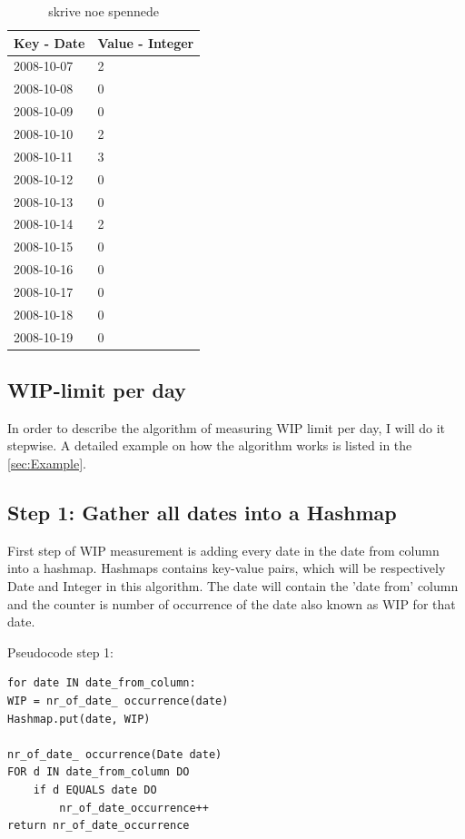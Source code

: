 \documentclass[UKenglish]{ifimaster}  %
\begin{document}
\begin{table}[ht]
\begin{center}
    \begin{tabular}{| l | p{5cm} |}
    \hline
     Key - Date  & Value - Integer\\ \hline
     2008-10-07 & 2   \\ \hline
     2008-10-08 & 0   \\ \hline
     2008-10-09 & 0   \\ \hline
     2008-10-10 & 2   \\ \hline
     2008-10-11 & 3   \\ \hline
     2008-10-12 & 0   \\ \hline
     2008-10-13 & 0   \\ \hline
     2008-10-14 & 2   \\ \hline
     2008-10-15 & 0   \\ \hline
     2008-10-16 & 0   \\ \hline
     2008-10-17 & 0   \\ \hline
     2008-10-18 & 0   \\ \hline
     2008-10-19 & 0   \\ \hline
    \end{tabular}
\caption{skrive noe spennede}
\label{IC} %
\end{center}
\end{table}

\subsection {WIP-limit per day}
In order to describe the algorithm of measuring WIP limit per day, I will do it stepwise.  A detailed example on how the algorithm works is listed in the \ref{sec:Example}.

\subsection{Step 1: Gather all dates into a Hashmap}
\label{sub:stepOne}
First step of WIP measurement is adding every date in the date from column into a hashmap. Hashmaps contains key-value pairs, which will be respectively Date and Integer in this algorithm.  The date will contain the 'date from' column and the counter is number of occurrence of the date also known as WIP for that date. 

Pseudocode step 1:
 \begin{lstlisting}
for date IN date_from_column:
WIP = nr_of_date_ occurrence(date)
Hashmap.put(date, WIP)

nr_of_date_ occurrence(Date date) 
FOR d IN date_from_column DO
	if d EQUALS date DO
		nr_of_date_occurrence++
return nr_of_date_occurrence
 \end{lstlisting}
\end{document}
